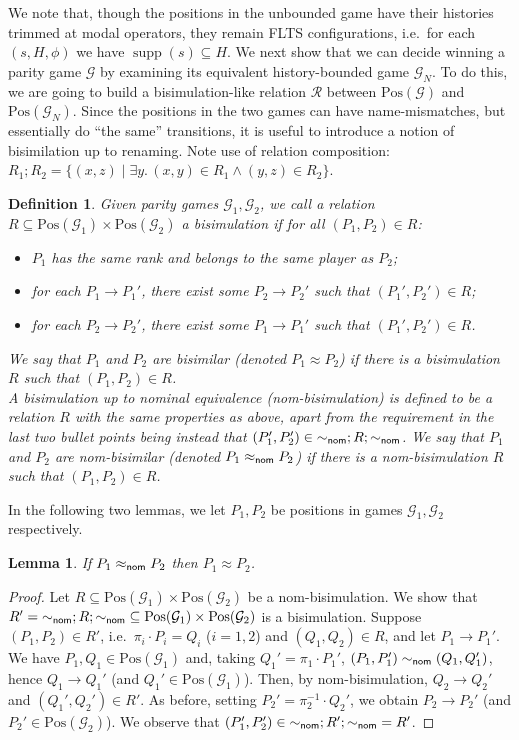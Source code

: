 \documentclass[10pt,a4paper]{article}
\newtheorem{lemma}[theorem]{Lemma}
\newtheorem{definition}[theorem]{Definition}
\theoremstyle{definition}
\theoremstyle{remark}
\newcommand\nombisim{\approx_{\sf nom}}
\newcommand\bisim{\approx}
\newcommand\nomeq[0]{\sim_{\sf nom}}
\newcommand\pos[0]{\mathrm{Pos}}
\DeclareMathOperator{\supp}{supp}
\newcommand\Gcal{\mathcal{G}}
\newcommand\Rcal{\mathcal{R}}
\begin{document}
We note that, though the positions in the unbounded game have their histories trimmed at modal operators, they remain FLTS configurations, i.e.\ for each $(s,H,\phi)$ we have $\supp(s)\subseteq H$. 
We next show that we can decide winning a parity game $\Gcal$ by examining its equivalent history-bounded game $\Gcal_N$.
To do this, we are going to build a bisimulation-like relation $\Rcal$ between $\pos(\Gcal)$ and $\pos(\Gcal_N)$. Since the positions in the two games can have name-mismatches, but essentially do ``the same'' transitions, it is useful to introduce a notion of {bisimilation} up to renaming. Note use of relation composition: $R_1;R_2=\{(x,z)\mid \exists y.\,(x,y)\in R_1\land (y,z)\in R_2\}$.

\begin{definition}
Given parity games $\Gcal_1, \Gcal_2$, we call a relation $R \subseteq \pos(\Gcal_1) \times \pos(\Gcal_2)$ a \emph{bisimulation} if for all $(P_1, P_2) \in R$:
    \begin{itemize}
        \item $P_1$ has the same rank and belongs to the same player as $P_2$;
        \item for each $P_1 \rightarrow P_1'$, there exist some $P_2 \rightarrow P_2'$  such that $(P_1',P_2')\in R$;
        \item for each $P_2 \rightarrow P_2'$, there exist some $P_1 \rightarrow P_1'$ such that $(P_1', P_2') \in R$.
    \end{itemize}
    We say that $P_1$ and $P_2$ are \emph{bisimilar} (denoted ${P_1}\bisim{P_2}$)
    if there is a bisimulation $R$ such that $(P_1, P_2) \in R$. \\
    A \emph{bisimulation up to nominal equivalence (nom-bisimulation)} is defined to be a relation $R$ with the same properties as above, apart from the requirement in the last two bullet points being instead that $(P_1',P_2')\in {\nomeq};R;{\nomeq}$.
    We say that $P_1$ and $P_2$ are \emph{nom-bisimilar} (denoted ${P_1}\nombisim{P_2}$)
    if there is a nom-bisimulation $R$ such that $(P_1, P_2) \in R$. 
\end{definition}

In the following two lemmas, we let $P_1,P_2$ be positions in games $\Gcal_1,\Gcal_2$ respectively.

\begin{lemma}\label{lem:nombisimbisim}
If $P_1\nombisim P_2$ then $P_1\bisim P_2$. \end{lemma}
\begin{proof}
  Let $R\subseteq\pos(\Gcal_1)\times\pos(\Gcal_2)$ be 
  a nom-bisimulation. We show that $R'={\nomeq;R;\nomeq}\subseteq\pos(\Gcal_1)\times\pos(\Gcal_2)$ is a bisimulation.
Suppose $(P_1,P_2)\in R'$, i.e.\ $\pi_i\cdot P_i=Q_i$ ($i=1,2$) and $(Q_1,Q_2)\in R$, and let $P_1\to P_1'$. We have $P_1,Q_1\in\pos(\Gcal_1)$ and, taking $Q_1'=\pi_1\cdot P_1'$, $(P_1,P_1')\nomeq(Q_1,Q_1')$, hence $Q_1\to Q_1'$ (and $Q_1'\in\pos(\Gcal_1)$). Then, by nom-bisimulation, $Q_2\to Q_2'$ and $(Q_1',Q_2')\in R'$. As before, setting $P_2'=\pi_2^{-1}\cdot Q_2'$, we obtain $P_2\to P_2'$ (and $P_2'\in\pos(\Gcal_2)$). We observe that $(P_1',P_2')\in{\nomeq;R';\nomeq}=R'$.
\end{proof}
\end{document}
